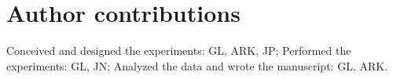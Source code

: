 
\section{Author contributions}

Conceived and designed the experiments: GL, ARK, JP; Performed the experiments: GL, JN; Analyzed the data and wrote the manuscript: GL, ARK.
